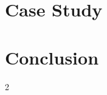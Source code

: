 \documentclass{article}
\begin{document}
\begin{CJK}{UTF8}{gbsn}
\begin{multicols}{2}
\section{Case Study}

\section{Conclusion}

\end{multicols}{2}



\clearpage\end{CJK}
\end{document}
